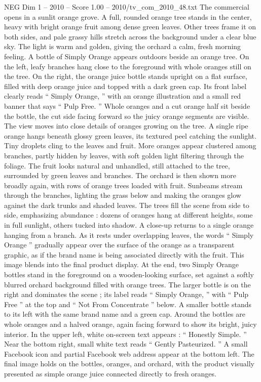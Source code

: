 \begin{textsample}{NEG Dim 1 – 2010 – Score 1.00 – 2010/tv\_com\_2010\_48.txt}  \label{ex:f1_neg_073}
The commercial opens in a sunlit orange grove.
A full, rounded orange tree stands in the center, heavy with bright orange fruit among dense green leaves.
Other trees frame it on both sides, and pale grassy hills stretch across the background under a clear blue sky.
The light is warm and golden, giving the orchard a calm, fresh morning feeling.
A bottle of Simply Orange appears outdoors beside an orange tree.
On the left, leafy branches hang close to the foreground with whole oranges still on the tree.
On the right, the orange juice bottle stands upright on a flat surface, filled with deep orange juice and topped with a dark green cap.
Its front label clearly reads “ Simply Orange, ” with an orange illustration and a small red banner that says “ Pulp Free. ” Whole oranges and a cut orange half sit beside the bottle, the cut side facing forward so the juicy orange segments are visible.
The view moves into close details of oranges growing on the tree.
A single ripe orange hangs beneath glossy green leaves, its textured peel catching the sunlight.
Tiny droplets cling to the leaves and fruit.
More oranges appear clustered among branches, partly hidden by leaves, with soft golden light filtering through the foliage.
The fruit looks natural and unhandled, still attached to the tree, surrounded by green leaves and branches.
The orchard is then shown more broadly again, with rows of orange trees loaded with fruit.
Sunbeams stream through the branches, lighting the grass below and making the oranges glow against the dark trunks and shaded leaves.
The trees fill the scene from side to side, emphasizing abundance : dozens of oranges hang at different heights, some in full sunlight, others tucked into shadow.
A close-up returns to a single orange hanging from a branch.
As it rests under overlapping leaves, the words “ Simply Orange ” gradually appear over the surface of the orange as a transparent graphic, as if the brand name is being associated directly with the fruit.
This image blends into the final product display.
At the end, two Simply Orange bottles stand in the foreground on a wooden-looking surface, set against a softly blurred orchard background filled with orange trees.
The larger bottle is on the right and dominates the scene ; its label reads “ Simply Orange, ” with “ Pulp Free ” at the top and “ Not From Concentrate ” below.
A smaller bottle stands to its left with the same brand name and a green cap.
Around the bottles are whole oranges and a halved orange, again facing forward to show its bright, juicy interior.
In the upper left, white on-screen text appears : “ Honestly Simple. ” Near the bottom right, small white text reads “ Gently Pasteurized. ” A small Facebook icon and partial Facebook web address appear at the bottom left.
The final image holds on the bottles, oranges, and orchard, with the product visually presented as simple orange juice connected directly to fresh oranges.

\end{textsample}
